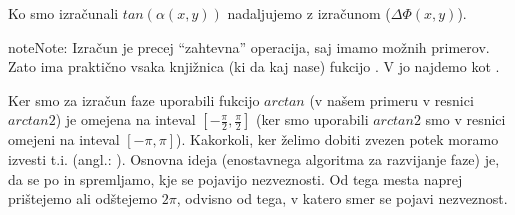\documentclass[letterpaper,10pt,english]{sphinxmanual}
\begin{document}
\sphinxAtStartPar
Ko smo izračunali \(tan({\alpha}(x,y))\) nadaljujemo z izračunom  (\({\Delta}{\Phi}(x,y)\)).

\begin{sphinxadmonition}{note}{Note:}
\sphinxAtStartPar
Izračun  je precej “zahtevna” operacija, saj imamo  možnih primerov. Zato ima praktično vsaka  knjižnica (ki da kaj nase) fukcijo . V  jo najdemo kot .
\end{sphinxadmonition}

\begin{sphinxVerbatim}[commandchars=\\\{\},numbers=left,firstnumber=1,stepnumber=1]
 

 

 




\end{sphinxVerbatim}

\sphinxAtStartPar
Ker smo za izračun faze uporabili fukcijo \(arctan\) (v našem primeru v resnici \(arctan2\)) je  omejena na inteval \([-\frac{\pi}{2}, \frac{\pi}{2} ]\) (ker smo uporabili \(arctan2\) smo v resnici omejeni na inteval \([-\pi, \pi ]\)). Kakorkoli, ker želimo dobiti zvezen potek  moramo izvesti t.i.  (angl.: ). Osnovna ideja (enostavnega algoritma za razvijanje faze) je, da se  po  in spremljamo, kje se pojavijo nezveznosti. Od tega mesta naprej prištejemo ali odštejemo \(2\pi\), odvisno od tega, v katero smer se pojavi nezveznost.
\end{document}
